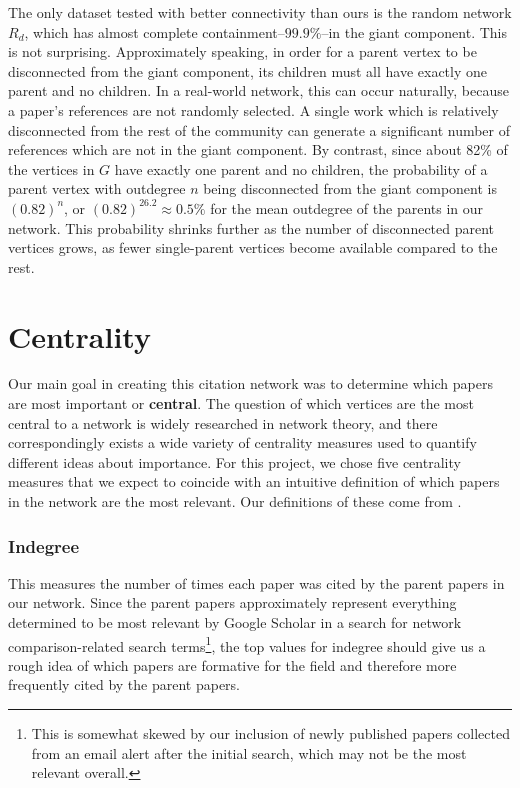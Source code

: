 \documentclass[12pt]{thesis}
\theoremstyle{plain}
\theoremstyle{definition}
\theoremstyle{remark}
\begin{document}
The only dataset tested with better connectivity than ours is the random network $R_d$, which has almost complete containment--$99.9\%$--in the giant component. This is not surprising. Approximately speaking, in order for a parent vertex to be disconnected from the giant component, its children must all have exactly one parent and no children.  In a real-world network, this can occur naturally, because a paper's references are not randomly selected. A single work which is relatively disconnected from the rest of the community can generate a significant number of references which are not in the giant component. By contrast, since about 82\% of the vertices in $G$ have exactly one parent and no children, the probability of a parent vertex with outdegree $n$ being disconnected from the giant component is $(0.82)^n$, or $(0.82)^{26.2} \approx 0.5\%$ for the mean outdegree of the parents in our network. This probability shrinks further as the number of disconnected parent vertices grows, as fewer single-parent vertices become available compared to the rest.








\section{Centrality}\label{section:centrality}

Our main goal in creating this citation network was to determine which papers are most important or \textbf{central}. The question of which vertices are the most central to a network is widely researched in network theory, and there correspondingly exists a wide variety of centrality measures used to quantify different ideas about importance. For this project, we chose five centrality measures that we expect to coincide with an intuitive definition of which papers in the network are the most relevant. Our definitions of these come from \cite{newman2010}.

\subsubsection{Indegree} This measures the number of times each paper was cited by the parent papers in our network. Since the parent papers approximately represent everything determined to be most relevant by Google Scholar in a search for network comparison-related search terms\footnote{This is somewhat skewed by our inclusion of newly published papers collected from an email alert after the initial search, which may not be the most relevant overall.}, the top values for indegree should give us a rough idea of which papers are formative for the field and therefore more frequently cited by the parent papers.
\end{document}
